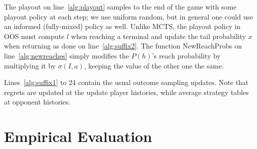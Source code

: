 \documentclass[letterpaper]{article}
\newcommand{\cP}{\mathcal{P}}
\newcommand{\tth}{\mathtt{h}}
\newcounter{mlNoteCounter}
\newcommand{\mlnote}[1]{{\scriptsize \color{darkgreen} $\blacksquare$ \refstepcounter{mlNoteCounter}\textsf{[ML]$_{\arabic{mlNoteCounter}}$:{#1}}}}
\begin{document}

The playout on line~\ref{alg:playout} samples to the end of the game with some playout policy at each step; we use uniform random, 
but in general one could use an informed (fully-mixed) policy as well. 
Unlike MCTS, the playout policy in OOS must compute $l$ when reaching a terminal and update the tail probability $x$ when returning
as done on line~\ref{alg:suffix2}. The function NewReachProbs on line~\ref{alg:newreaches} simply modifies the $P(h)$'s reach 
probability by multiplying it by $\sigma(I,a)$, keeping the value of the other one the same.

Lines~\ref{alg:suffix1} to 24
contain the usual outcome sampling updates. Note that regrets are updated at the 
update player histories, while average strategy tables at opponent histories. 

\section{Empirical Evaluation}

\end{document}
